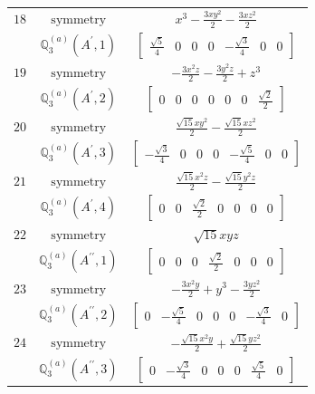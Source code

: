 \documentclass[fleqn,8pt,landscape]{jsarticle}
\begin{document}
\begin{longtable}{ccc}
$ 18 $ & $ \text{symmetry} $ & $ x^{3} - \frac{3 x y^{2}}{2} - \frac{3 x z^{2}}{2} $ \\
$  $ & $ \mathbb{Q}_{3}^{(a)}(A^{\prime},1) $ & $ \begin{bmatrix} \frac{\sqrt{5}}{4} & 0 & 0 & 0 & - \frac{\sqrt{3}}{4} & 0 & 0 \end{bmatrix} $ \\ \hline
$ 19 $ & $ \text{symmetry} $ & $ - \frac{3 x^{2} z}{2} - \frac{3 y^{2} z}{2} + z^{3} $ \\
$  $ & $ \mathbb{Q}_{3}^{(a)}(A^{\prime},2) $ & $ \begin{bmatrix} 0 & 0 & 0 & 0 & 0 & 0 & \frac{\sqrt{2}}{2} \end{bmatrix} $ \\ \hline
$ 20 $ & $ \text{symmetry} $ & $ \frac{\sqrt{15} x y^{2}}{2} - \frac{\sqrt{15} x z^{2}}{2} $ \\
$  $ & $ \mathbb{Q}_{3}^{(a)}(A^{\prime},3) $ & $ \begin{bmatrix} - \frac{\sqrt{3}}{4} & 0 & 0 & 0 & - \frac{\sqrt{5}}{4} & 0 & 0 \end{bmatrix} $ \\ \hline
$ 21 $ & $ \text{symmetry} $ & $ \frac{\sqrt{15} x^{2} z}{2} - \frac{\sqrt{15} y^{2} z}{2} $ \\
$  $ & $ \mathbb{Q}_{3}^{(a)}(A^{\prime},4) $ & $ \begin{bmatrix} 0 & 0 & \frac{\sqrt{2}}{2} & 0 & 0 & 0 & 0 \end{bmatrix} $ \\ \hline
$ 22 $ & $ \text{symmetry} $ & $ \sqrt{15} x y z $ \\
$  $ & $ \mathbb{Q}_{3}^{(a)}(A^{\prime\prime},1) $ & $ \begin{bmatrix} 0 & 0 & 0 & \frac{\sqrt{2}}{2} & 0 & 0 & 0 \end{bmatrix} $ \\ \hline
$ 23 $ & $ \text{symmetry} $ & $ - \frac{3 x^{2} y}{2} + y^{3} - \frac{3 y z^{2}}{2} $ \\
$  $ & $ \mathbb{Q}_{3}^{(a)}(A^{\prime\prime},2) $ & $ \begin{bmatrix} 0 & - \frac{\sqrt{5}}{4} & 0 & 0 & 0 & - \frac{\sqrt{3}}{4} & 0 \end{bmatrix} $ \\ \hline
$ 24 $ & $ \text{symmetry} $ & $ - \frac{\sqrt{15} x^{2} y}{2} + \frac{\sqrt{15} y z^{2}}{2} $ \\
$  $ & $ \mathbb{Q}_{3}^{(a)}(A^{\prime\prime},3) $ & $ \begin{bmatrix} 0 & - \frac{\sqrt{3}}{4} & 0 & 0 & 0 & \frac{\sqrt{5}}{4} & 0 \end{bmatrix} $ \\ \hline

\end{longtable}
\end{document}
